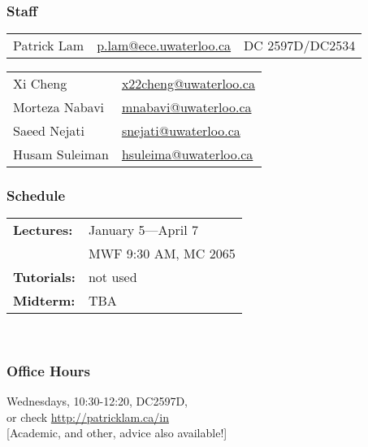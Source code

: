 \begin{frame}
  \frametitle{Staff}

  \begin{center}
    {\bf {}}

    \begin{tabular}{lll}
      Patrick Lam &
      \href{mailto:p.lam@ece.uwaterloo.ca}{p.lam@ece.uwaterloo.ca} &
      DC 2597D/DC2534 \\
    \end{tabular}
    \vfill
    {\bf {}}

    \begin{tabular}{ll}
Xi Cheng &
\href{mailto:x22cheng@uwaterloo.ca}{x22cheng@uwaterloo.ca}\\
Morteza Nabavi &
\href{mailto:mnabavi@uwaterloo.ca}{mnabavi@uwaterloo.ca}\\
Saeed Nejati &
\href{mailto:snejati@uwaterloo.ca}{snejati@uwaterloo.ca}\\
Husam Suleiman &\href{mailto:hsuleima@uwaterloo.ca}{hsuleima@uwaterloo.ca}
    \end{tabular}
  \end{center}
\end{frame}

\begin{frame}
  \frametitle{Schedule}

  \begin{changemargin}{2cm}
\begin{tabular}{ll}{\bf Lectures:} &
  January 5---April 7 \\ & MWF 9:30 AM, MC 2065\\
{\bf Tutorials:}& not used\\[1em]
{\bf Midterm:}& TBA
  \end{tabular}~\\[1em]
  \end{changemargin}
\end{frame}

\begin{frame}
  \frametitle{Office Hours}

  \begin{changemargin}{2cm}
    Wednesdays, 10:30-12:20, DC2597D,\\[1em]
    or check \url{http://patricklam.ca/in}\\[1em]
    [Academic, and other, advice also available!]
  \end{changemargin}
\end{frame}


